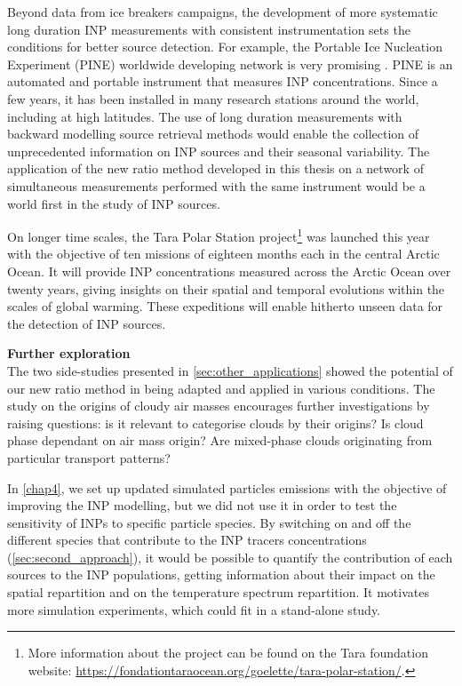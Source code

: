 Beyond data from ice breakers campaigns, the development of more systematic long duration INP measurements with consistent instrumentation sets the conditions for better source detection.
For example, the Portable Ice Nucleation Experiment (PINE) worldwide developing network is very promising \citep{mohler_portable_2021}. PINE is an automated and portable instrument that measures INP concentrations. Since a few years, it has been installed in many research stations around the world, including at high latitudes.
The use of long duration measurements with backward modelling source retrieval methods would enable the collection of unprecedented information on INP sources and their seasonal variability. 
The application of the new ratio method  developed in this thesis on a network of simultaneous measurements performed with the same instrument would be a world first in the study of INP sources.

On longer time scales, the Tara Polar Station project\footnote{More information about the project can be found on the Tara foundation website: \url{https://fondationtaraocean.org/goelette/tara-polar-station/}.} was launched this year with the objective of ten missions of eighteen months each in the central Arctic Ocean.
It will provide INP concentrations measured across the Arctic Ocean over twenty years, giving insights on their spatial and temporal evolutions within the scales of global warming. These expeditions will enable hitherto unseen data for the detection of INP sources.
\vspace{\baselineskip}

\textbf{Further exploration}\\
The two side-studies presented in \cref{sec:other_applications} showed the potential of our new ratio method in being adapted and applied in various conditions.  
The study on the origins of cloudy air masses encourages further investigations by raising questions: is it relevant to categorise clouds by their origins? Is cloud phase dependant on air mass origin? Are mixed-phase clouds originating from particular transport patterns?

In \cref{chap4}, we set up updated simulated particles emissions with the objective of improving the INP modelling, but we did not use it in order to test the sensitivity of INPs to specific particle species.
By switching on and off the different species that contribute to the INP tracers concentrations (\cref{sec:second_approach}), it would be possible to quantify the contribution of each sources to the INP populations, getting information about their impact on the spatial repartition and on the temperature spectrum repartition.
It motivates more simulation experiments, which could fit in a stand-alone study.

